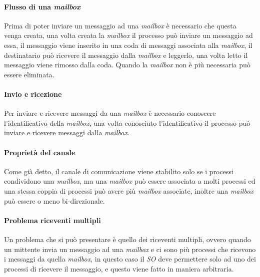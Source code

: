             \paragraph{Flusso di una \textit{mailbox}}
                Prima di poter inviare un messaggio ad una \textit{mailbox} è necessario che questa venga creata, una volta creata la \textit{mailbox} il processo può inviare un messaggio ad essa, il messaggio viene inserito in una coda di messaggi associata alla \textit{mailbox}, il destinatario può ricevere il messaggio dalla \textit{mailbox} e leggerlo, una volta letto il messaggio viene rimosso dalla coda. Quando la \textit{mailbox} non è più necessaria può essere eliminata.
            \paragraph{Invio e ricezione} 
                Per inviare e ricevere messaggi da una \textit{mailbox} è necessario conoscere l'identificativo della \textit{mailbox}, una volta conosciuto l'identificativo il processo può inviare e ricevere messaggi dalla \textit{mailbox}.
            \paragraph{Proprietà del canale} Come già detto, il canale di comunicazione viene stabilito solo se i processi condividono una \textit{mailbox}, ma una \textit{mailbox} può essere associata a molti processi ed una stessa coppia di processi può avere più \textit{mailbox} associate, inoltre una \textit{mailbox} può essere o meno bi-direzionale.
            \paragraph{Problema riceventi multipli} Un problema che si può presentare è quello dei riceventi multipli, ovvero quando un mittente invia un messaggio ad una \textit{mailbox} e ci sono più processi che ricevono i messaggi da quella \textit{mailbox}, in questo caso il \textit{SO} deve permettere solo ad uno dei processi di ricevere il messaggio, e questo viene fatto in maniera arbitraria.
